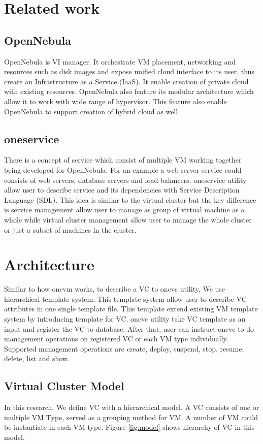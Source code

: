 \documentclass[conference]{IEEEtran}
\begin{document}
\section{Related work}

\subsection{OpenNebula}
OpenNebula is VI manager. It orchestrate VM placement, networking and resources such as disk images and expose unified cloud interface to its user, thus create an Infrastructure as a Service (IaaS).
It enable creation of private cloud with existing resources.
OpenNebula also feature its modular architecture which allow it to work with wide range of hypervisor.
This feature also enable OpenNebula to support creation of hybrid cloud as well.

\subsection{oneservice}
There is a concept of service which consist of multiple VM working together being developed for OpenNebula.
For an example a web server service could consists of web servers, database servers and load-balancers.
oneservice\cite{oneservice} utility allow user to describe service and its dependencies with Service Description Language (SDL).
This idea is similar to the virtual cluster but the key difference is service management allow user to manage as group of virtual machine as a whole while virtual cluster management allow user to manage the whole cluster or just a subset of machines in the cluster.

\section{Architecture}
Similar to how onevm works, to describe a VC to onevc utility, We use hierarchical template system.
This template system allow user to describe VC attributes in one single template file.
This template extend existing VM template system by introducing template for VC.
onevc utility take VC template as an input and register the VC to database.
After that, user can instruct onevc to do management operations on registered VC or each VM type individually.
Supported management operations are create, deploy, suspend, stop, resume, delete, list and show.

\subsection{Virtual Cluster Model}
In this research, We define VC with a hierarchical model.
A VC consists of one or multiple VM Type, served as a grouping method for VM.
A number of VM could be instantiate in each VM type.
Figure \ref{fig:model} shows hierarchy of VC in this model.
\end{document}
